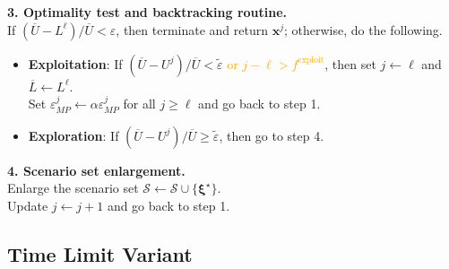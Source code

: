 \documentclass[preprint,review,11pt]{elsarticle}
\theoremstyle{definition}
\theoremstyle{remark}
\newcommand{\tp}{\top}
\newcommand{\epst}{\widetilde{\varepsilon}}
\newcommand{\calS}{\mathcal{S}}
\newcommand{\xb}{\pmb{x}}
\newcommand{\yb}{\pmb{y}}
\newcommand{\hb}{\pmb{h}}
\newcommand{\qb}{\pmb{q}}
\newcommand{\xib}{\pmb{\xi}}
\newcommand{\Cb}{\pmb{C}}
\newcommand{\Tb}{\pmb{T}}
\newcommand{\Wb}{\pmb{W}}
\newcommand{\Lbar}{\overline{L}}
\newcommand{\Ubar}{\overline{U}}
\begin{document}
\begin{algorithm}[h]
\textbf{3. Optimality test and backtracking routine.} \\
\hspace{5.3mm}If $(\Ubar-L^\ell)/\Ubar<\varepsilon$, then terminate and return $\xb^j$; otherwise, do the following.
%
\begin{itemize}
    \item \textbf{Exploitation}: If $(\Ubar-U^j)/\Ubar < \epst$ \textcolor{orange}{or $j-\ell > f^\text{exploit}$}, then set $j\leftarrow \ell$ and $\Lbar\leftarrow L^\ell$. \\
    Set $\varepsilon^j_{MP}\leftarrow \alpha \varepsilon^j_{MP}$ for all $j\geq \ell$ and go back to step 1. \vspace{-3mm}
    \item \textbf{Exploration}: If $(\Ubar-U^j)/\Ubar  \geq \epst$, then go to step 4.  \vspace{-3mm}
\end{itemize}
%
\textbf{4. Scenario set enlargement.}\\
\hspace{5.3mm}Enlarge the scenario set $\calS \leftarrow \calS\cup\{\xib^\star\}$. \\ \hspace{5.3mm}Update $j \leftarrow j+1$ and go back to step 1.
\BlankLine
\caption{Inexact column-and-constraint (i-C\&CG) method, exploitation frequency variant} \label{algo:inexact_C&CG_V1}
\end{algorithm}\DecMargin{1em}



\subsection{Time Limit Variant}
\end{document}
